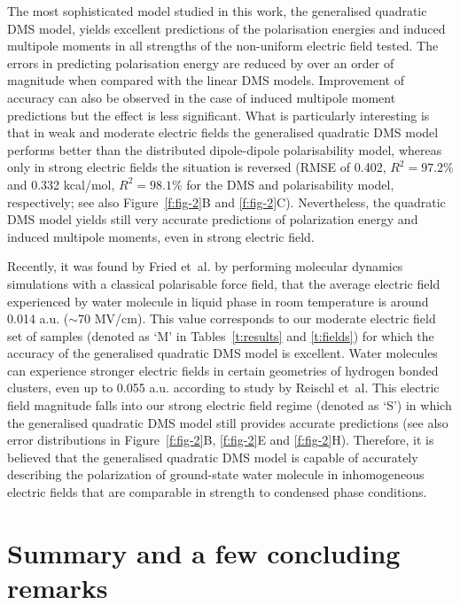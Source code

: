 \documentclass[aip,amsmath,amssymb,reprint,floatfix]{revtex4-1}
\begin{document}
The most sophisticated model studied in this work, the generalised quadratic DMS model, yields excellent predictions 
of the polarisation energies and induced multipole moments in all strengths of the non\hyp{}uniform electric field tested.
The errors in predicting polarisation energy are reduced by over an order of magnitude when compared with
the linear DMS models. Improvement of accuracy can also be observed in the case of induced multipole moment predictions
but the effect is less significant.
What is particularly interesting is that in weak and moderate electric fields
the generalised quadratic DMS model performs better than the distributed dipole\hyp{}dipole
polarisability model, whereas only in strong electric fields the situation is reversed
(RMSE of 0.402, $R^2=97.2\%$ and 0.332 kcal/mol, $R^2=98.1\%$ for the DMS and polarisability model, respectively; 
see also Figure~\ref{f:fig-2}B and \ref{f:fig-2}C).
Nevertheless, the quadratic DMS model yields still very accurate predictions 
of polarization energy and induced multipole moments, even in strong electric field.

Recently, it was found by Fried et~al. by performing molecular dynamics simulations with a classical 
polarisable force field, that the average electric field experienced by water molecule in liquid phase
in room temperature is around 0.014 a.u. ($\sim$70 MV/cm).\cite{Fried.Wang.Boxer.Ren.Pande.JPCB.2013}
This value corresponds to our moderate electric field set of samples (denoted as `M' in Tables~\ref{t:results}
and \ref{t:fields}) for which the
accuracy of the generalised quadratic DMS model is excellent.
Water molecules can experience
stronger electric fields in certain geometries of hydrogen bonded clusters, 
even up to 0.055 a.u. according to study by Reischl et~al.\cite{Reischl.Kofinger.Dellago.MolPhys.2009} 
This electric field magnitude falls into our strong electric field regime (denoted as `S')
in which the generalised quadratic DMS model still provides accurate predictions (see also error distributions 
in Figure~\ref{f:fig-2}B, \ref{f:fig-2}E and \ref{f:fig-2}H). Therefore, it is believed that
the generalised quadratic DMS model is capable of accurately describing 
the polarization of ground\hyp{}state water molecule in inhomogeneous 
electric fields that are comparable in strength to condensed phase conditions.



\section{\label{s:5}Summary and a few concluding remarks}
\end{document}

